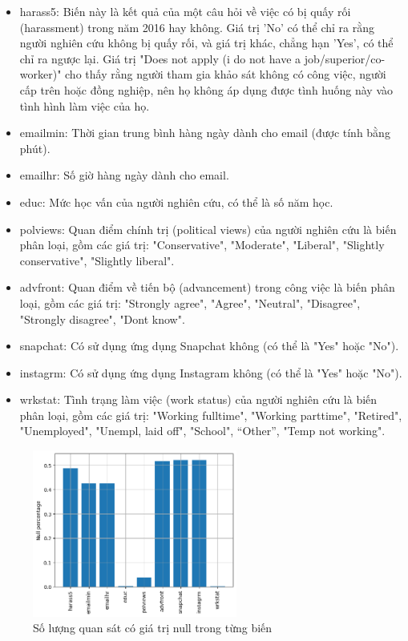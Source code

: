 \begin{itemize}
    \item harass5: Biến này là kết quả của một câu hỏi về việc có bị quấy rối (harassment) trong năm 2016 hay không. 
    Giá trị 'No' có thể chỉ ra rằng người nghiên cứu không bị quấy rối, và giá trị khác, chẳng hạn 'Yes', có thể chỉ ra ngược lại. Giá trị "Does not apply (i do not have a job/superior/co-worker)" cho thấy rằng người tham gia khảo sát không có công việc, người cấp trên hoặc đồng nghiệp, nên họ không áp dụng được tình huống này vào tình hình làm việc của họ.
    \item emailmin: Thời gian trung bình hàng ngày dành cho email (được tính bằng phút).
    \item emailhr: Số giờ hàng ngày dành cho email.
    \item educ: Mức học vấn của người nghiên cứu, có thể là số năm học.
    \item polviews: Quan điểm chính trị (political views) của người nghiên cứu là biến phân loại, gồm các giá trị: "Conservative", "Moderate", "Liberal", "Slightly conservative", "Slightly liberal".
    \item advfront: Quan điểm về tiến bộ (advancement) trong công việc là biến phân loại, gồm các giá trị: "Strongly agree", "Agree", "Neutral", "Disagree", "Strongly disagree", "Dont know".
    \item snapchat: Có sử dụng ứng dụng Snapchat không (có thể là "Yes" hoặc "No").
    \item instagrm: Có sử dụng ứng dụng Instagram không (có thể là "Yes" hoặc "No").
    \item wrkstat: Tình trạng làm việc (work status) của người nghiên cứu là biến phân loại, gồm các giá trị: "Working fulltime", "Working parttime", "Retired", "Unemployed", "Unempl, laid off", "School", “Other”, "Temp not working".
\end{itemize}

\begin{figure}[h!]
    \centering
    \includegraphics[width=0.6\textwidth]{figures/Thanh/Data_Analysis/null_percentage_columns.png}
    \caption{Số lượng quan sát có giá trị null trong từng biến}
    \label{fig:null_percentage_columns}
\end{figure}

